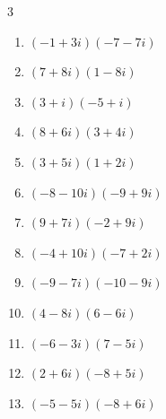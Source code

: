 \begin{multicols}{3}
\begin{enumerate}
  \item $\displaystyle (-1+3i)(-7-7i)$

        \phantom{$\displaystyle =28-14i$}

  \item $\displaystyle (7+8i)(1-8i)$

        \phantom{$\displaystyle =71-48i$}

  \item $\displaystyle (3+i)(-5+i)$

        \phantom{$\displaystyle =-16-2i$}

  \item $\displaystyle (8+6i)(3+4i)$

        \phantom{$\displaystyle =50i$}

\columnbreak %

  \item $\displaystyle (3+5i)(1+2i)$

        \phantom{$\displaystyle =-7+11i$}

  \item $\displaystyle (-8-10i)(-9+9i)$

        \phantom{$\displaystyle =162+18i$}

  \item $\displaystyle (9+7i)(-2+9i)$

        \phantom{$\displaystyle =-81+67i$}

  \item $\displaystyle (-4+10i)(-7+2i)$

        \phantom{$\displaystyle =8-78i$}

  \item $\displaystyle (-9-7i)(-10-9i)$

        \phantom{$\displaystyle =27+151i$}

  \item $\displaystyle (4-8i)(6-6i)$

        \phantom{$\displaystyle =-24-72i$}

  \item $\displaystyle (-6-3i)(7-5i)$

        \phantom{$\displaystyle =-57+9i$}

  \item $\displaystyle (2+6i)(-8+5i)$

        \phantom{$\displaystyle =-46-38i$}

  \item $\displaystyle (-5-5i)(-8+6i)$


\end{enumerate}
\end{multicols}
